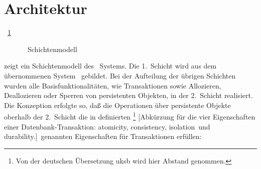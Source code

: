 \section{Architektur}\label{sec:arplob}
%
\figurename~\ref{fig:ploblay} %
%
\begin{figure}[htbp]%
\ifbuch%
\centerline{}%
\else%
\centerline{}%
\fi%
\caption{\protect\plob\ Schichtenmodell}%
\label{fig:ploblay}%
\end{figure}%
%
zeigt ein Schichtenmodell des \plob\ Systems. Die 1.~Schicht wird aus
dem \"{u}ber\-nom\-me\-nen System \postore\ gebildet. Bei der Aufteilung
der \"{u}brigen Schichten wurden alle Basisfunktionalit\"{a}ten, wie
Transaktionen sowie Allozieren, Deallozieren oder Sperren von
persistenten Objekten, in der 2.~Schicht realisiert. Die Konzeption
erfolgte so, da\ss{} die Operationen \"{u}ber persistente Objekte oberhalb
der 2.~Schicht die in
\cite[]{bib:gr93} definierten \acid%
\footnote{Von der deutschen \"{U}bersetzung {\sc uksb} wird hier Abstand
genommen.}%
[{Abk\"{u}rzung f\"{u}r die vier Eigenschaften einer
Datenbank-Transaktion:
\protect{}%
{atomicity},
\protect{}%
{consistency},
\protect{}%
{isolation}\ und
\protect{}%
{durability}.}]\ genannten
Eigenschaften f\"{u}r Transaktionen erf\"{u}llen:
